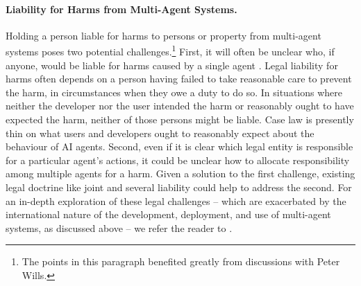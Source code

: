 \paragraph{Liability for Harms from Multi-Agent Systems.}
Holding a person liable for harms to persons or property from multi-agent systems poses two potential challenges.\footnote{The points in this paragraph benefited greatly from discussions with Peter Wills.}
First, it will often be unclear who, if anyone, would be liable for harms caused by a single agent \citep{Kolt2024}. Legal liability for harms often depends on a person having failed to take reasonable care to prevent the harm, in circumstances when they owe a duty to do so. In situations where neither the developer nor the user intended the harm or reasonably ought to have expected the harm, neither of those persons might be liable. Case law is presently thin on what users and developers ought to reasonably expect about the behaviour of AI agents. Second, even if it is clear which legal entity is responsible for a particular agent's actions, it could be unclear how to allocate responsibility among multiple agents for a harm. Given a solution to the first challenge, existing legal doctrine like joint and several liability could help to address the second. For an in-depth exploration of these legal challenges -- which are exacerbated by the international nature of the development, deployment, and use of multi-agent systems, as discussed above -- we refer the reader to \citep{Wills2024, ayres_law_2024, lima_could_2017, lior_ai_2019,Chopra2011, Solum1992}.



